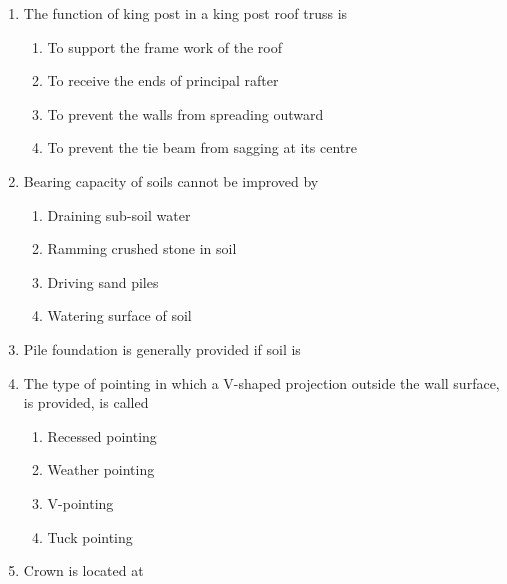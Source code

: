 \documentclass[11pt,a4paper]{article}
\begin{document}
\begin{enumerate}
\item{The function of king post in a king post roof truss is}
\begin{enumerate}[label=\Alph*.]
\item{To support the frame work of the roof}
\item{To receive the ends of principal rafter}
\item{To prevent the walls from spreading outward}
\item{To prevent the tie beam from sagging at its centre}
\end{enumerate}
\item{Bearing capacity of soils cannot be improved by}
\begin{enumerate}[label=\Alph*.]
\item{Draining sub-soil water}
\item{Ramming crushed stone in soil}
\item{Driving sand piles}
\item{Watering surface of soil}
\end{enumerate}
\item{Pile foundation is generally provided if soil is}
\\
\item{The type of pointing in which a V-shaped projection outside the wall surface, is provided, is called}
\begin{enumerate}[label=\Alph*.]
\item{Recessed pointing}
\item{Weather pointing}
\item{V-pointing}
\item{Tuck pointing}
\end{enumerate}
\item{Crown is located at}
\begin{enumerate}[label=\Alph*.]

\end{enumerate}
\end{enumerate}
\end{document}
